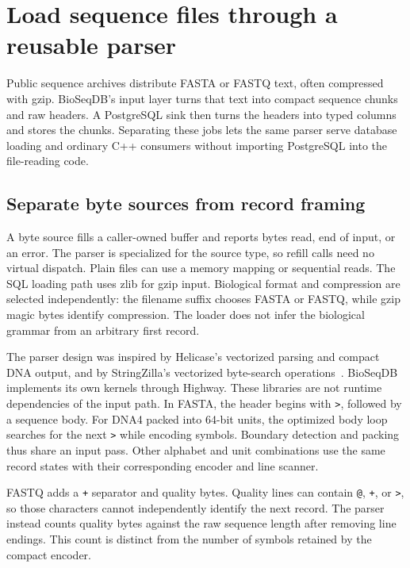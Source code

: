 \section{Load sequence files through a reusable parser}
\label{sec:arch-ingestion}
\label{sec:io-loading-contract}

Public sequence archives distribute FASTA or FASTQ text, often compressed with
gzip. BioSeqDB's input layer turns that text into compact sequence chunks and
raw headers. A PostgreSQL sink then turns the headers into typed columns and
stores the chunks. Separating these jobs lets the same parser serve database
loading and ordinary C++ consumers without importing PostgreSQL into the
file-reading code.

\subsection{Separate byte sources from record framing}
\label{sec:arch-io-sources}
\label{sec:io-reader-architecture}
\label{sec:io-parsing}

A byte source fills a caller-owned buffer and reports bytes read, end of input,
or an error. The parser is specialized for the source type, so refill calls
need no virtual dispatch. Plain files can use a memory mapping or sequential
reads. The SQL loading path uses zlib for gzip input. Biological format and
compression are selected independently: the filename suffix chooses FASTA or
FASTQ, while gzip magic bytes identify compression. The loader does not infer
the biological grammar from an arbitrary first record.

The parser design was inspired by Helicase's vectorized parsing and compact
DNA output, and by StringZilla's vectorized byte-search
operations~\autocite{helicase,stringzilla}. BioSeqDB implements its own kernels
through Highway. These libraries are not runtime dependencies of the input
path. In FASTA, the header begins with \texttt{>}, followed by a sequence body.
For DNA4 packed into 64-bit units, the optimized body loop searches for the
next \texttt{>} while encoding symbols. Boundary detection and packing thus
share an input pass. Other alphabet and unit combinations use the same record
states with their corresponding encoder and line scanner.

FASTQ adds a \texttt{+} separator and quality bytes. Quality lines can contain
\texttt{@}, \texttt{+}, or \texttt{>}, so those characters cannot independently
identify the next record. The parser instead counts quality bytes against the
raw sequence length after removing line endings. This count is distinct from
the number of symbols retained by the compact encoder.

